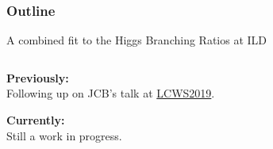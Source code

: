   \begin{frame}[noframenumbering]
    \frametitle{Outline}
    \begin{minipage}{.9\paperwidth}\noindent\center
      \Large A combined fit to the Higgs Branching Ratios at ILD
    \end{minipage}
    \vfill
    \begin{columns}[c,onlytextwidth]
      \begin{column}{0.4\textwidth}
        \textbf{\color{llblue}Previously:}\\
        Following up on JCB's talk at \href{https://agenda.linearcollider.org/event/8217/timetable/\#190-a-method-to-improve-the-pr}{\color{llblue} LCWS2019}.

        \bigbreak
        \textbf{\color{llblue}Currently:}\\
        Still a work in progress.
        
      \end{column}
      \begin{column}{0.5\textwidth}
        \tableofcontents
      \end{column}
    \end{columns}
  \end{frame}